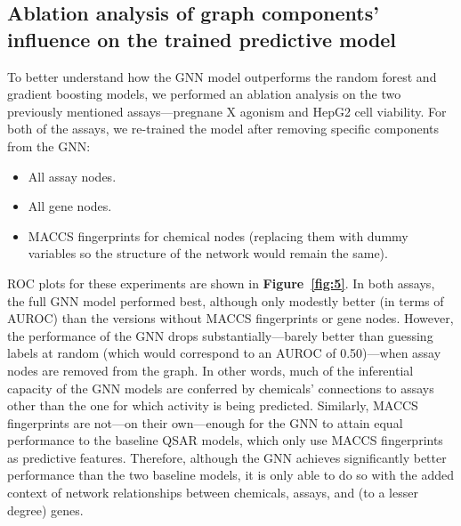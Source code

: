 \documentclass{ws-procs11x85}
\begin{document}
\subsection{Ablation analysis of graph components' influence on the trained predictive model}
To better understand how the GNN model outperforms the random forest and gradient boosting models, we performed an ablation analysis on the two previously mentioned assays---pregnane X agonism and HepG2 cell viability.
For both of the assays, we re-trained the model after removing specific components from the GNN:
\begin{itemize}
   \item All assay nodes.
   \item All gene nodes.
   \item MACCS fingerprints for chemical nodes (replacing them with dummy variables so the structure of the network would remain the same).
\end{itemize}
ROC plots for these experiments are shown in \textbf{Figure~\ref{fig:5}}.
In both assays, the full GNN model performed best, although only modestly better (in terms of AUROC) than the versions without MACCS fingerprints or gene nodes.
However, the performance of the GNN drops substantially---barely better than guessing labels at random (which would correspond to an AUROC of 0.50)---when assay nodes are removed from the graph.
In other words, much of the inferential capacity of the GNN models are conferred by chemicals' connections to assays other than the one for which activity is being predicted.
Similarly, MACCS fingerprints are not---on their own---enough for the GNN to attain equal performance to the baseline QSAR models, which only use MACCS fingerprints as predictive features.
Therefore, although the GNN achieves significantly better performance than the two baseline models, it is only able to do so with the added context of network relationships between chemicals, assays, and (to a lesser degree) genes.
\end{document}
